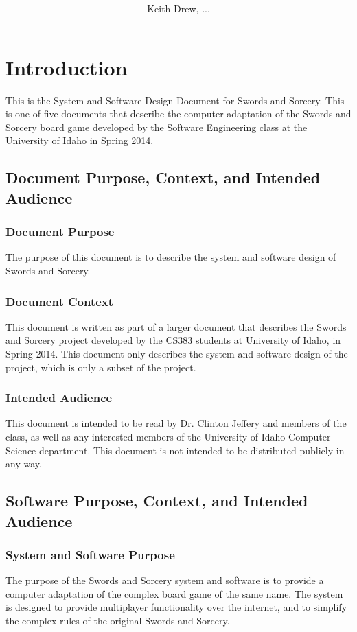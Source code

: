 \documentclass[12pt,a4paper]{article}
\title{\center{\textbf{\Large{System and Software Design Description(SSDD):}\\
\large{Incorporating Architectural Views and Detailed Design Criteria}\\
\normalsize{For}\\
\large{Swords and Sorcery}}}\\}
\author{Keith Drew, ...}
\begin{document}
\maketitle
\pagebreak
\setcounter{tocdepth}{3}
\renewcommand\contentsname{\center{Swords and Sorcery Design\\Table of Contents}}
\tableofcontents

\section{Introduction}
This is the System and Software Design Document for Swords and Sorcery. This is one of five documents that describe the computer adaptation of the Swords and Sorcery board game developed by the Software Engineering class at the University of Idaho in Spring 2014.
\subsection{Document Purpose, Context, and Intended Audience}
\subsubsection{Document Purpose}
The purpose of this document is to describe the system and software design of Swords and Sorcery. 
\subsubsection{Document Context}
This document is written as part of a larger document that describes the Swords and Sorcery project developed by the CS383 students at University of Idaho, in Spring 2014. This document only describes the system and software design of the project, which is only a subset of the project.
\subsubsection{Intended Audience}
This document is intended to be read by Dr. Clinton Jeffery and members of the class, as well as any interested members of the University of Idaho Computer Science department. This document is not intended to be distributed publicly in any way.
\subsection{Software Purpose, Context, and Intended Audience}
\subsubsection{System and Software Purpose}
The purpose of the Swords and Sorcery system and software is to provide a computer adaptation of the complex board game of the same name. The system is designed to provide multiplayer functionality over the internet, and to simplify the complex rules of the original Swords and Sorcery.
\end{document}
